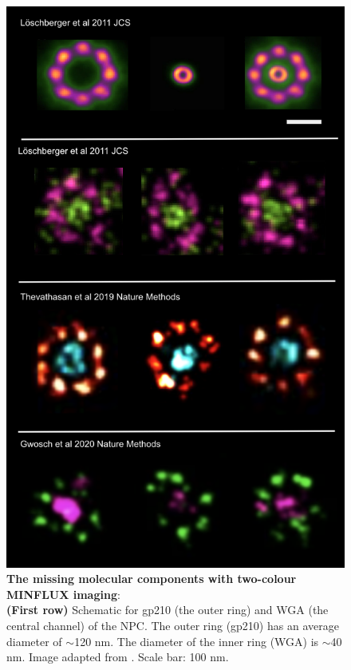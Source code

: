 \documentclass[9pt,twocolumn,twoside]{pnas-new}
\begin{document}
\begin{figure}[h!]
\begin{center}
\includegraphics[width=\linewidth]{Figures/NPC3_v2}
\end{center}
\caption[]{\textbf{The missing molecular components with two-colour MINFLUX imaging}:\\
\textbf{(First row)} Schematic for gp210 (the outer ring) and WGA (the central channel) of the NPC. 
The outer ring (gp210) has an average diameter of $\sim$120 nm. The diameter of the inner ring (WGA) is $\sim$40 nm. Image adapted from  \cite{loschberger2012super}.  Scale bar: 100 nm. \\
}
\end{figure}
\end{document}
